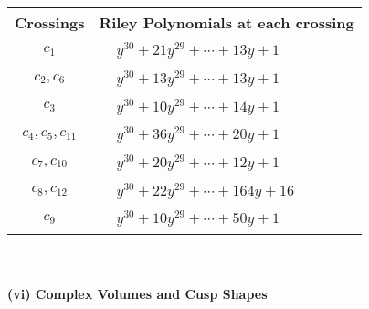 \documentclass[1p]{elsarticle_modified}
\theoremstyle{definition}
\begin{document}
\begin{tabular}{m{50pt}|m{274pt}}
Crossings & \hspace{64pt}Riley Polynomials at each crossing \\
\hline $$\begin{aligned}c_{1}\end{aligned}$$&$\begin{aligned}
&y^{30}+21 y^{29}+\cdots+13 y+1
\end{aligned}$\\
\hline $$\begin{aligned}c_{2},c_{6}\end{aligned}$$&$\begin{aligned}
&y^{30}+13 y^{29}+\cdots+13 y+1
\end{aligned}$\\
\hline $$\begin{aligned}c_{3}\end{aligned}$$&$\begin{aligned}
&y^{30}+10 y^{29}+\cdots+14 y+1
\end{aligned}$\\
\hline $$\begin{aligned}c_{4},c_{5},c_{11}\end{aligned}$$&$\begin{aligned}
&y^{30}+36 y^{29}+\cdots+20 y+1
\end{aligned}$\\
\hline $$\begin{aligned}c_{7},c_{10}\end{aligned}$$&$\begin{aligned}
&y^{30}+20 y^{29}+\cdots+12 y+1
\end{aligned}$\\
\hline $$\begin{aligned}c_{8},c_{12}\end{aligned}$$&$\begin{aligned}
&y^{30}+22 y^{29}+\cdots+164 y+16
\end{aligned}$\\
\hline $$\begin{aligned}c_{9}\end{aligned}$$&$\begin{aligned}
&y^{30}+10 y^{29}+\cdots+50 y+1
\end{aligned}$\\
\hline
\end{tabular}\\~\\
\newpage\flushleft \textbf{(vi) Complex Volumes and Cusp Shapes}
\end{document}
